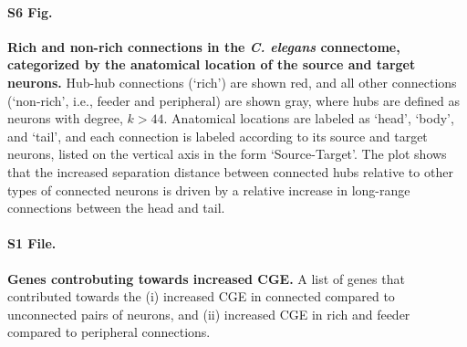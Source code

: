 \documentclass[10pt,letterpaper]{article}
\begin{document}
\paragraph*{S6 Fig.}
\label{S6_Fig}
{\bf Rich and non-rich connections in the \emph{C. elegans} connectome, categorized by the  anatomical location of the source and target neurons.}
   Hub-hub connections (`rich') are shown red, and all other connections (`non-rich', i.e., feeder and peripheral) are shown gray, where hubs are defined as neurons with degree, $k > 44$.
Anatomical locations are labeled as `head', `body', and `tail', and each connection is labeled according to its source and target neurons, listed on the vertical axis in the form `Source-Target'.
The plot shows that the increased separation distance between connected hubs relative to other types of connected neurons is driven by a relative increase in long-range connections between the head and tail.

\paragraph*{S1 File.}
\label{file:geneList}
{\bf Genes controbuting towards increased CGE.}
A list of genes that contributed towards the (i) increased CGE in connected compared to unconnected pairs of neurons, and (ii) increased CGE in rich and feeder compared to peripheral connections. 
\end{document}
